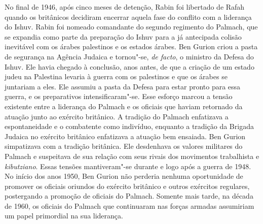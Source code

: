 No final de 1946, após cinco meses de detenção, Rabin foi libertado de
Rafah quando os britânicos decidiram encerrar aquela fase do conflito
com a liderança do Ishuv. Rabin foi nomeado comandante do segundo
regimento do Palmach, que se expandia como parte da preparação do Ishuv
para a já antecipada colisão inevitável com os árabes palestinos e os
estados árabes. Ben Gurion criou a pasta de segurança na Agência Judaica
e tornou"-se, \textit{de facto}, o ministro da Defesa do Ishuv. Ele havia
chegado à conclusão, anos antes, de que a criação de um estado judeu na
Palestina levaria à guerra com os palestinos e que os árabes se
juntariam a eles. Ele assumiu a pasta da Defesa para estar pronto para
essa guerra, e os preparativos intensificaram"-se. Esse esforço marcou a
tensão existente entre a liderança do Palmach e os oficiais que haviam
retornado da atuação junto ao exército britânico. A tradição do Palmach
enfatizava a espontaneidade e o combatente como indivíduo, enquanto a
tradição da Brigada Judaica no exército britânico enfatizava a atuação
bem ensaiada. Ben Gurion simpatizava com a tradição britânica. Ele
desdenhava os valores militares do Palmach e suspeitava de sua relação
com seus rivais dos movimentos trabalhista e \textit{kibutziano}. Essas tensões
mantiveram"-se durante e logo após a guerra de 1948. No início dos anos
1950, Ben Gurion não perderia nenhuma oportunidade de promover os
oficiais oriundos do exército britânico e outros exércitos regulares,
postergando a promoção de oficiais do Palmach. Somente mais tarde, na
década de 1960, os oficiais do Palmach que continuaram nas forças
armadas assumiriam um papel primordial na sua liderança.


